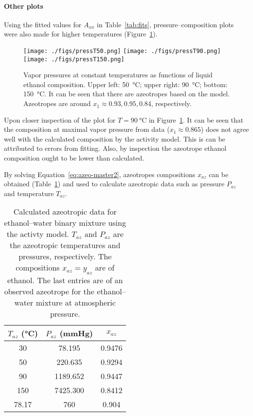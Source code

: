 \paragraph{Other plots}

Using the fitted values for $A_{xx}$ in Table~\ref{tab:fits},
pressure--composition plots were also made for higher temperatures
(Figure~\ref{fig:press-high}).

\begin{figure}[ht]
    \centering
    \texttt{[image: ./figs/pressT50.png]}
    \texttt{[image: ./figs/pressT90.png]}
    \texttt{[image: ./figs/pressT150.png]}
    \caption{Vapor pressures at constant temperatures as functions of 
    liquid ethanol composition. Upper left: \SI{50}{\celsius}; upper
    right: \SI{90}{\celsius}; bottom: \SI{150}{\celsius}. It can be seen
    that there are azeotropes based on the model.
    Azeotropes are around $x_1 \approx 0.93, 0.95, 0.84$, respectively.}
    \label{fig:press-high}
\end{figure}

Upon closer inspection of the plot for $T=\SI{90}{\celsius}$ in 
Figure~\ref{fig:press-high}. It can be seen that the composition at 
maximal vapor pressure from data ($x_1\approx 0.865$) does not agree well 
with the calculated composition by the activity model. This is can be 
attributed to errors from fitting. Also, by inspection the azeotrope ethanol 
composition ought to be lower than calculated.

By solving Equation~\ref{eq:azeo-master2}, azeotropes compositions $x_{az}$
can be obtained (Table~\ref{tab:azeo}) and used to calculate azeotropic data
such as pressure $P_{az}$ and temperature $T_{az}$.

\begin{table}[ht]
    \centering
    \caption{Calculated azeotropic data for ethanol--water binary mixture
    using the activty model. $T_{az}$ and $P_{az}$ are the azeotropic
    temperatures and pressures, respectively. The compositions $x_{az}=
    y_{az}$ are of ethanol. The last entries are of an observed azeotrope
    for the ethanol--water mixture at atmospheric pressure.}
    \medskip
    \begin{tabular}{ccc}
        $T_{az}$ (\si{\celsius}) & $P_{az}$ (\si{\mmHg}) & $x_{az}$ \\ \hline
        \num{30} & \num{78.195} & \num{0.9476} \\
        \num{50} & \num{220.635} & \num{0.9294} \\
        \num{90} & \num{1189.652} & \num{0.9447} \\
        \num{150} & \num{7425.300} & \num{0.8412} \\
        \hline
        \num{78.17} & \num{760} & \num{0.904}
    \end{tabular}
    \label{tab:azeo}
\end{table}

